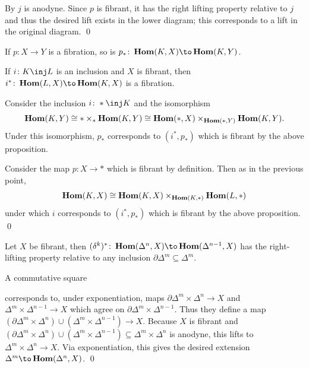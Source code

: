     By  $j$ is anodyne.
    Since $p$ is fibrant, it has the right lifting property relative to $j$ and thus the desired lift exists in the lower
    diagram; this corresponds to a lift in the original diagram.
    \qed

\eproof

\bcoro[name={ihomfibrations}]

    \benum
        \item If $p\colon X\to Y$ is a fibration, so is $p_*\colon\ihom(K,X)\to\ihom(K,Y)$.
        \item If $i\colon K\inj L$ is an inclusion and $X$ is fibrant, then $i^*\colon\ihom(L,X)\to\ihom(K,X)$ is a fibration.
    \eenum

\ecoro

\bproof

    \benum
        \item Consider the inclusion $i\colon*\inj K$ and the isomorphism
        $$ \mathop{\bf Hom}\nolimits(K,Y) \cong *\times_*\mathop{\bf Hom}\nolimits(K,Y) \cong \mathop{\bf Hom}\nolimits(*,X) \times_{\mathop{\bf Hom}\nolimits(*,Y)} \mathop{\bf Hom}\nolimits(K,Y) . $$
        Under this isomorphism, $p_*$ corresponds to $(i^*,p_*)$ which is fibrant by the above proposition.

        \item Consider the map $p\colon X\to*$ which is fibrant by definition.
        Then as in the previous point,
        $$ \mathop{\bf Hom}\nolimits(K,X) \cong \mathop{\bf Hom}\nolimits(K,X)\times_{\mathop{\bf Hom}\nolimits(K,*)}\mathop{\bf Hom}\nolimits(L,*) $$
        under which $i$ corresponds to $(i^*,p_*)$ which is fibrant by the above proposition.
        \qed
    \eenum

\eproof

\blemm[name={facemapsrlp}]

    Let $X$ be fibrant, then $(\delta^k)^*\colon\ihom(\Delta^n,X)\to\ihom(\Delta^{n-1},X)$ has the right-lifting property relative to any inclusion $\partial\Delta^m\subseteq\Delta^m$.

\elemm

\bproof

    A commutative square

    \centerline{}

    corresponds to, under exponentiation, maps $\partial\Delta^m\times\Delta^n\to X$ and $\Delta^m\times\Delta^{n-1}\to X$ which agree on $\partial\Delta^m\times\Delta^{n-1}$.
    Thus they define a map $(\partial\Delta^m\times\Delta^n)\cup(\Delta^m\times\Delta^{n-1})\to X$.
    Because $X$ is fibrant and $(\partial\Delta^m\times\Delta^n)\cup(\Delta^m\times\Delta^{n-1})\subseteq\Delta^m\times\Delta^n$ is anodyne, this lifts to $\Delta^m\times\Delta^n\to X$.
    Via exponentiation, this gives the desired extension $\Delta^m\to\ihom(\Delta^n,X)$.
    \qed

\eproof

